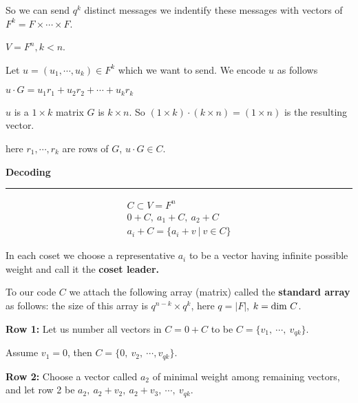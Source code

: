 \documentclass{article}
\newcommand{\header}[1]{
	\begin{Large}
	\noindent\textbf{#1}
	\vspace{2pt}
	\hrule
	\vspace{16pt}
	\end{Large}
	\normalsize
}
\newcommand{\eqs}[1]{
	\begin{gather*}
		#1
	\end{gather*}
}
\begin{document}
So we can send $q^k$ distinct messages we indentify these messages with vectors
of $F^k = F \times \cdots \times F$.

$V = F^n, k < n$.

Let $u = (u_1, \cdots, u_k) \in F^k$ which we want to send. We encode $u$ as
follows

$u \cdot G = u_1r_1 + u_2r_2 + \cdots + u_kr_k$

$u$ is a $1 \times k$ matrix $G$ is $k \times n$. So $(1 \times k) \cdot
	(k \times n) = (1 \times n)$ is the resulting vector.

here $r_1, \cdots, r_k$ are rows of $G$, $u\cdot G \in C$.

\header{Decoding}

\eqs{
	C \subset V = F^n \\
	0+C,\ a_1+C,\ a_2+C  \\
	a_i + C = \{a_i + v\ |\ v \in C\}
}

In each coset we choose a representative $a_i$ to be a vector having infinite
possible weight and call it the \textbf{coset leader.}

To our code $C$ we attach the following array (matrix) called the
\textbf{standard array} as follows: the size of this array is
$q^{n-k} \times q^k$, here $q = |F|$, $k = \textnormal{dim } C$.

\textbf{Row 1:} Let us number all vectors in $C = 0+C$ to be
$C = \{v_1,\ \cdots,\ v_{qk}\}$.

Assume $v_1 = 0$, then $C = \{0,\ v_2,\ \cdots, v_{qk}\}$.

\textbf{Row 2:} Choose a vector called $a_2$ of minimal weight among remaining
vectors, and let row 2 be $a_2,\ a_2+v_2,\ a_2+v_3,\ \cdots,\ v_{qk}$.
\end{document}
